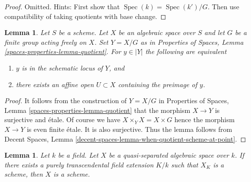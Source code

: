 \documentclass{stacks-project}
\theoremstyle{plain}
\newtheorem{lemma}[subsection]{Lemma}
\theoremstyle{definition}
\theoremstyle{remark}
\numberwithin{equation}{subsection}
\def\Spec{\mathop{\mathrm{Spec}}}
\begin{document}
\begin{proof}
Omitted. Hints: First show that $\Spec(k) = \Spec(k')/G$.
Then use compatibility of taking quotients with base change.
\end{proof}

\begin{lemma}
\label{lemma-when-quotient-scheme-at-point}
Let $S$ be a scheme. Let $X$ be an algebraic space over $S$ and
let $G$ be a finite group acting freely on $X$. Set $Y = X/G$ as
in Properties of Spaces, Lemma \ref{spaces-properties-lemma-quotient}.
For $y \in |Y|$ the following are equivalent
\begin{enumerate}
\item $y$ is in the schematic locus of $Y$, and
\item there exists an affine open $U \subset X$
containing the preimage of $y$.
\end{enumerate}
\end{lemma}

\begin{proof}
It follows from the construction of $Y = X/G$ in
Properties of Spaces, Lemma \ref{spaces-properties-lemma-quotient}
that the morphism $X \to Y$ is surjective and \'etale.
Of course we have $X \times_Y X = X \times G$ hence the morphism
$X \to Y$ is even finite \'etale. It is also surjective.
Thus the lemma follows from
Decent Spaces, Lemma \ref{decent-spaces-lemma-when-quotient-scheme-at-point}.
\end{proof}

\begin{lemma}
\label{lemma-scheme-after-purely-transcendental-base-change}
Let $k$ be a field. Let $X$ be a quasi-separated
algebraic space over $k$. If there exists a purely transcendental
field extension $K/k$ such that $X_K$ is a scheme, then
$X$ is a scheme.
\end{lemma}
\end{document}
